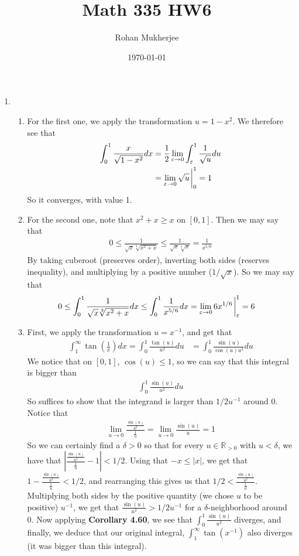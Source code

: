 \documentclass[12pt]{article}
\title{Math 335 HW6}
\date{\today}
\author{Rohan Mukherjee}
\def\mbb#1{\mathbb{#1}}
\def\bR{\mbb{R}}
\theoremstyle{definition}
\theoremstyle{remark}
\newcommand{\ve}{\varepsilon}
\begin{document}
	\maketitle
	\begin{enumerate}[leftmargin=\labelsep]
		\item 
		\begin{enumerate}
			\item For the first one, we apply the transformation $u = 1-x^2$. We therefore see that
			\begin{align*}
				\int_0^1 \frac{x}{\sqrt{1-x^2}}dx &= \frac12 \lim_{\ve \to 0} \int_\ve^1 \frac1{\sqrt{u}}du \\
				&= \lim_{\ve \to 0} \sqrt{u}\eval_0^1 = 1
			\end{align*}
			So it converges, with value 1.
			\item For the second one, note that $x^2 + x \geq x$ on $[0, 1]$. Then we may say that
			\begin{align*}
				0 \leq \frac1{\sqrt{x}\sqrt[3]{x^2+x}} \leq \frac1{\sqrt{x}\sqrt[3]{x}}=\frac1{x^{5/6}}
			\end{align*}
			By taking cuberoot (preserves order), inverting both sides (reserves inequality), and multiplying by a positive number ($1/\sqrt{x}$). So we may say that 
			\begin{align*}
				0 \leq \int_0^1 \frac1{\sqrt{x}\sqrt[3]{x^2+x}}dx \leq \int_0^1 \frac1{x^{5/6}}dx &= \lim_{\ve \to 0} 6 x^{1/6} \eval_\ve^1 = 6
			\end{align*}
		\item First, we apply the transformation $u = x^{-1}$, and get that
		\begin{align*}
			\int_1^\infty \tan(\frac1x)dx = \int_0^1 \frac{\tan(u)}{u^2}du &= \int_0^1 \frac{\sin(u)}{\cos(u)u^2}du
		\end{align*}
		We notice that on $[0, 1]$, $\cos(u) \leq 1$, so we can say that this integral is bigger than
		\begin{align*}
			\int_0^1 \frac{\sin(u)}{u^2}du
		\end{align*}
		So suffices to show that the integrand is larger than $1/2u^{-1}$ around 0. Notice that 
		\begin{align*}
			\lim_{u \to 0} \frac{\frac{\sin(u)}{u^2}}{\frac1u} = \lim_{u \to 0} \frac{\sin(u)}{u} = 1
		\end{align*}
		So we can certainly find a $\delta > 0$ so that for every $u \in \bR_{>0}$ with $u < \delta$, we have that $|\frac{\frac{\sin(u)}{u^2}}{\frac1u}-1| < 1/2$. Using that $-x \leq |x|$, we get that
		$1-\frac{\frac{\sin(u)}{u^2}}{\frac1u} < 1/2$, and rearranging this gives us that $1/2 < \frac{\frac{\sin(u)}{u^2}}{\frac1u}$. Multiplying both sides by the positive quantity (we chose $u$ to be positive) $u^{-1}$, we get that $\frac{\sin(u)}{u^2} > 1/2u^{-1}$ for a $\delta$-neighborhood around 0. Now applying \textbf{Corollary 4.60}, we see that $\int_0^1 \frac{\sin(u)}{u^2}$ diverges, and finally, we deduce that our original integral, $\int_1^\infty \tan(x^{-1})$ also diverges (it was bigger than this integral).
		\end{enumerate}
		

\end{enumerate}
\end{document}

